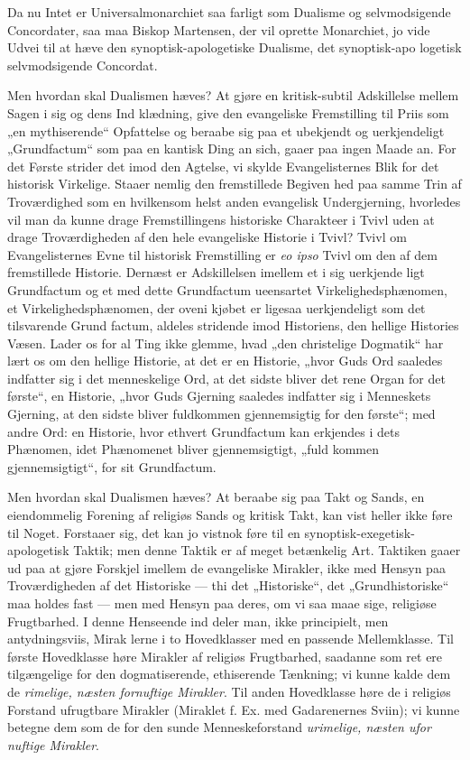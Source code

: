 \documentclass[12pt]{book}
\newcommand{\opage}[1]{\marginnote{\footnotesize\textit{[#1]}}}
\begin{document}
Da nu Intet er Universalmonarchiet saa farligt som
Dualisme og selvmodsigende Concordater, saa maa Biskop
Martensen, der vil oprette Monarchiet, jo vide Udvei til at
hæve den synoptisk-apologetiske Dualisme, det synoptisk-apo\-%
logetisk selvmodsigende Concordat.

Men hvordan skal Dualismen hæves? At gjøre en
kritisk-subtil Adskillelse mellem Sagen i sig og dens Ind\-%
klædning, give den evangeliske Fremstilling til Priis som „en
mythiserende“ Opfattelse og beraabe sig paa et ubekjendt og
uerkjendeligt „Grundfactum“ som paa en kantisk Ding an
sich, gaaer paa ingen Maade an. For det Første strider
det imod den Agtelse, vi skylde Evangelisternes Blik for det
historisk Virkelige. Staaer nemlig den fremstillede Begiven\-%
hed paa samme Trin af Troværdighed som en hvilkensom\-%
helst anden evangelisk Undergjerning, hvorledes vil man da
kunne drage Fremstillingens historiske Charakteer i Tvivl
uden at drage Troværdigheden af den hele evangeliske Historie
i Tvivl? Tvivl om Evangelisternes Evne til historisk
Fremstilling er \textit{eo ipso} Tvivl om den af dem fremstillede
Historie. Dernæst er Adskillelsen imellem et i sig uerkjende\-%
ligt Grundfactum og et med dette Grundfactum ueensartet
Virkelighedsphænomen, et Virkelighedsphænomen, der oveni\-%
kjøbet er ligesaa uerkjendeligt som det tilsvarende Grund\-%
factum, aldeles stridende imod Historiens, den hellige Histories
Væsen. Lader os for al Ting ikke glemme, hvad „den
christelige Dogmatik“ har lært os om den hellige Historie,
at det er en Historie, „hvor Guds Ord saaledes indfatter
sig i det menneskelige Ord, at det sidste bliver det rene
Organ for det første“, en Historie, „hvor Guds Gjerning
\opage{74}\setcounter{footnote}{0}%
saaledes indfatter sig i Menneskets Gjerning, at den sidste
bliver fuldkommen gjennemsigtig for den første“; med andre
Ord: en Historie, hvor ethvert Grundfactum kan erkjendes i
dets Phænomen, idet Phænomenet bliver gjennemsigtigt, „fuld\-%
kommen gjennemsigtigt“, for sit Grundfactum.

Men hvordan skal Dualismen hæves? At beraabe sig
paa Takt og Sands, en eiendommelig Forening af religiøs
Sands og kritisk Takt, kan vist heller ikke føre til Noget.
Forstaaer sig, det kan jo vistnok føre til en synoptisk-exegetisk-%
apologetisk Taktik; men denne Taktik er af meget betænkelig
Art. Taktiken gaaer ud paa at gjøre Forskjel imellem de
evangeliske Mirakler, ikke med Hensyn paa Troværdigheden
af det Historiske --- thi det „Historiske“, det „Grundhistoriske“
maa holdes fast --- men med Hensyn paa deres, om vi saa
maae sige, religiøse Frugtbarhed. I denne Henseende ind\-%
deler man, ikke principielt, men antydningsviis, Mirak\-%
lerne i to Hovedklasser med en passende Mellemklasse. Til
første Hovedklasse høre Mirakler af religiøs Frugtbarhed,
saadanne som ret ere tilgængelige for den dogmatiserende,
ethiserende Tænkning; vi kunne kalde dem de \emph{rimelige,
næsten fornuftige Mirakler}. Til anden Hovedklasse
høre de i religiøs Forstand ufrugtbare Mirakler (Miraklet f. Ex.
med Gadarenernes Sviin); vi kunne betegne dem som de
for den sunde Menneskeforstand \emph{urimelige, næsten ufor\-%
nuftige Mirakler}.
\end{document}
